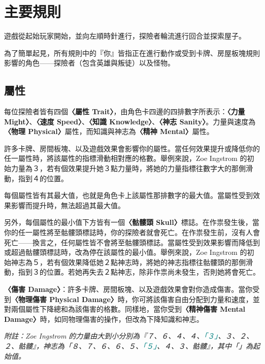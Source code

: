
\section{主要規則} \label{sec:main}

遊戲從起始玩家開始，並向左順時針進行，探險者輪流進行回合並探索屋子。

為了簡單起見，所有規則中的『你』皆指正在進行動作或受到卡牌、房屋板塊規則影響的角色——探險者（包含英雄與叛徒）以及怪物。


\subsection{屬性}

每位探險者皆有四個\textbf{〈屬性 Trait〉}，由角色卡四邊的四排數字所表示：\textbf{〈力量 Might〉}、\textbf{〈速度 Speed〉}、\textbf{〈知識 Knowledge〉}、\textbf{〈神志 Sanity〉}。力量與速度為\textbf{〈物理 Physical〉}屬性，而知識與神志為\textbf{〈精神 Mental〉}屬性。

許多卡牌、房間板塊、以及遊戲效果會影響你的屬性。當任何效果提升或降低你的任一屬性時，將該屬性的指標滑動相對應的格數。舉例來說，Zoe Ingstrom 的初始力量為３，若有個效果提升她３點力量時，將她的力量指標往數字大的那側滑動，指到４的位置。

每個屬性皆有其最大值，也就是角色卡上該屬性那排數字的最大值。當屬性受到效果影響而提升時，無法超過其最大值。

另外，每個屬性的最小值下方皆有一個\textbf{〈骷髏頭 Skull〉}標誌。在作祟發生後，當你的任一屬性將至骷髏頭標誌時，你的探險者就會死亡。在作祟發生前，沒有人會死亡——換言之，任何屬性皆不會將至骷髏頭標誌。當屬性受到效果影響而降低到或超過骷髏頭標誌時，改為停在該屬性的最小值。舉例來說，Zoe Ingstrom 的初始神志為５，若有個效果降低她２點神志時，將她的神志指標往骷髏頭的那側滑動，指到３的位置。若她再失去２點神志，除非作祟尚未發生，否則她將會死亡。

\textbf{〈傷害 Damage〉}：許多卡牌、房間板塊、以及遊戲效果會對你造成傷害。當你受到\textbf{〈物理傷害 Physical Damage〉}時，你可將該傷害自由分配到力量和速度，並對兩個屬性下降總和為該傷害的格數。同樣地，當你受到\textbf{〈精神傷害 Mental Damage〉}時，如同物理傷害的操作，但改為下降知識和神志。

\emph{附註：Zoe Ingstrom 的力量由大到小分別為『７、６、４、４、\textcolor{teal}{「３」}、３、２、２、骷髏』，神志為「８、７、６、６、５、\textcolor{teal}{「５」}、４、３、骷髏』，其中「」為起始值。}

